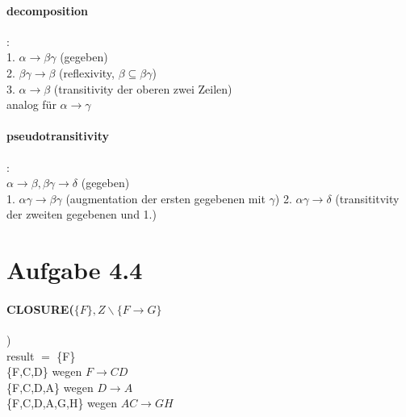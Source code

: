 \documentclass{article}
\begin{document}
		\paragraph*{decomposition}:\\
			1. $\alpha \rightarrow \beta \gamma$ \hspace*{31mm} (gegeben)\\
			2. $\beta \gamma \rightarrow \beta$ \hspace*{31mm} (reflexivity, $\beta \subseteq \beta\gamma$)\\
			3. $\alpha \rightarrow \beta$ \hspace*{33mm} (transitivity der oberen zwei Zeilen)\\
			analog für $\alpha \rightarrow \gamma$
		
		\paragraph*{pseudotransitivity}:\\
			$\alpha \rightarrow \beta, \beta\gamma \rightarrow \delta$ \hspace*{25mm} (gegeben)\\
			1. $ \alpha\gamma \rightarrow \beta\gamma $ \hspace*{29mm} (augmentation der ersten gegebenen mit $\gamma$)
			2. $\alpha \gamma \rightarrow \delta$ \hspace*{31mm} (transititvity der zweiten gegebenen und 1.)\\
			
			
		
		
	\section*{Aufgabe 4.4}
		\paragraph*{CLOSURE($\{ F \}, Z\backslash\{F \longrightarrow G\}$})\\
		result $=$ \{F\}\\
		
			\{F,C,D\} \hspace*{42mm} wegen $F \rightarrow CD$\\
			
			\{F,C,D,A\} \hspace*{39mm} wegen $D \rightarrow A$\\
			
			\{F,C,D,A,G,H\} \hspace*{32mm} wegen $AC \rightarrow GH$\\
			
\end{document}

